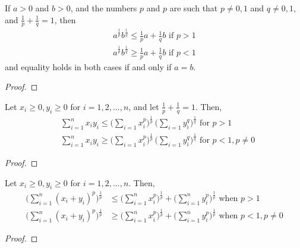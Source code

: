  \begin{lemma}
    \label{thm:youngs-inequalities}
    If $a>0$ and $b>0$, and the numbers $p$ and $p$ are such that $p \neq 0, 1$ and $q \neq 0, 1$, and $\frac{1}{p} + \frac{1}{q} = 1$, then 
    \begin{align}
      a^{\frac{1}{p}} b^{\frac{1}{q}} \leq \frac{1}{p} a + \frac{1}{q} b \text{  if } p > 1 \\
      a^{\frac{1}{p}} b^{\frac{1}{q}} \geq \frac{1}{p} a + \frac{1}{q} b \text{  if } p < 1
    \end{align}
    and equality holds in both cases if and only if $a = b$. 
  \end{lemma}
  \begin{proof}
    
  \end{proof}

  \begin{lemma}
    \label{thm:holders-inequalities}
    Let $x_i \geq 0, y_i \geq 0$ for $i = 1, 2, ..., n$, and let $\frac{1}{p} + \frac{1}{q} = 1$. Then, 
    \begin{align}
      &\sum_{i=1}^n x_i y_i \leq \bigg( \sum_{i=1} x_i^p \bigg)^{\frac{1}{p}} \, \bigg( \sum_{i=1} y_i^q \bigg)^{\frac{1}{q}} \text{  for } p > 1 \\
      &\sum_{i=1}^n x_i y_i \geq \bigg( \sum_{i=1} x_i^p \bigg)^{\frac{1}{p}} \, \bigg( \sum_{i=1} y_i^q \bigg)^{\frac{1}{q}} \text{  for } p < 1, p \neq 0
    \end{align}
  \end{lemma}
  \begin{proof}
    
  \end{proof}

  \begin{lemma}
    \label{thm:minkowskis-inequalities}
    Let $x_i \geq 0, y_i \geq 0$ for $i = 1, 2, ... ,n$. Then, 
    \begin{align}
      \bigg( \sum_{i=1}^n (x_i + y_i)^p \bigg)^{\frac{1}{p}} & \leq \bigg( \sum_{i=1}^n x_i^p \bigg)^\frac{1}{p} + \bigg( \sum_{i=1}^n y_i^p \bigg)^{\frac{1}{p}} \text{  when } p > 1 \\
      \bigg( \sum_{i=1}^n (x_i + y_i)^p \bigg)^{\frac{1}{p}} & \geq \bigg( \sum_{i=1}^n x_i^p \bigg)^\frac{1}{p} + \bigg( \sum_{i=1}^n y_i^p \bigg)^{\frac{1}{p}} \text{  when } p < 1, p \neq 0
    \end{align}
  \end{lemma}
  \begin{proof}
    
  \end{proof}

